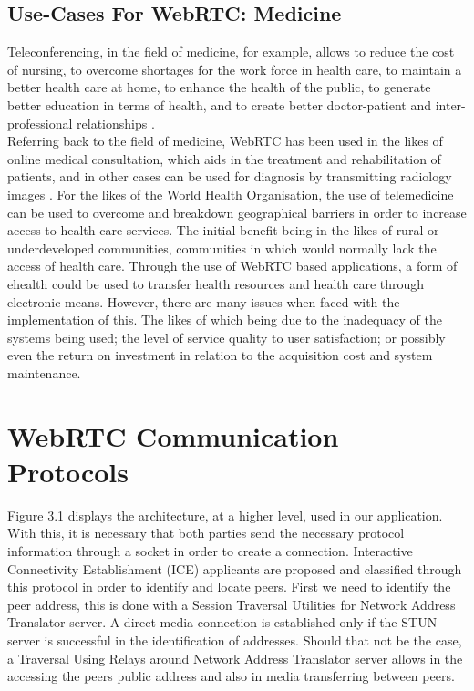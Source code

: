 \subsection{Use-Cases For WebRTC: Medicine}
Teleconferencing, in the field of medicine, for example, allows to reduce the cost of nursing, to overcome shortages for the work force in health care, to maintain a better health care at home, to enhance the health of the public, to generate better education in terms of health, and to create better doctor-patient and inter-professional relationships \cite{14003034520191201}. 
\\Referring back to the field of medicine, WebRTC has been used in the likes of online medical consultation, which aids in the treatment and rehabilitation of patients, and in other cases can be used for diagnosis by transmitting radiology images \cite{14003034520191201}. For the likes of the World Health Organisation, the use of telemedicine can be used to overcome and breakdown geographical barriers in order to increase access to health care services. The initial benefit being in the likes of rural or underdeveloped communities, communities in which would normally lack the access of health care. Through the use of WebRTC based applications, a form of ehealth could be used to transfer health resources and health care through electronic means. However, there are many issues when faced with the implementation of this. The likes of which being due to the inadequacy of the systems being used; the level of service quality to user satisfaction; or possibly even the return on investment in relation to the acquisition cost and system maintenance. \cite{S187705091632345620160101}

\section{WebRTC Communication Protocols}
Figure 3.1 displays the architecture, at a higher level, used in our application. With this, it is necessary that both parties send the necessary protocol information through a socket in order to create a connection. Interactive Connectivity Establishment (ICE) applicants are proposed and classified through this protocol in order to identify and locate peers. First we need to identify the peer address, this is done with a Session Traversal Utilities for Network Address Translator server. A direct media connection is established only if the STUN server is successful in the identification of addresses. Should that not be the case, a Traversal Using Relays around Network Address Translator server allows in the accessing the peers public address and also in media transferring between peers\cite{14003034520191201}.

